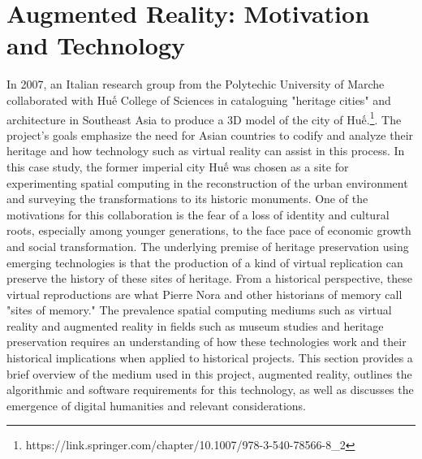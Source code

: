 \chapter[Augmented Reality]{Augmented Reality: Motivation and Technology}\label{text}
\vi
In 2007, an Italian research group from the Polytechic University of Marche collaborated with Huế College of Sciences in cataloguing "heritage cities" and architecture in Southeast Asia to produce a 3D model of the city of Huế.\footnote{https://link.springer.com/chapter/10.1007/978-3-540-78566-8\_2}. The project's goals emphasize the need for Asian countries to codify and analyze their heritage and how technology such as virtual reality can assist in this process. In this case study, the former imperial city Huế was chosen as a site for experimenting spatial computing in the reconstruction of the urban environment and surveying the transformations to its historic monuments. One of the motivations for this collaboration is the fear of a loss of identity and cultural roots, especially among younger generations, to the face pace of economic growth and social transformation. The underlying premise of heritage preservation using emerging technologies is that the production of a kind of virtual replication can preserve the history of these sites of heritage. From a historical perspective, these virtual reproductions are what Pierre Nora and other historians of memory call "sites of memory." The prevalence spatial computing mediums such as virtual reality and augmented reality in fields such as museum studies and heritage preservation requires an understanding of how these technologies work and their historical implications when applied to historical projects. This section provides a brief overview of the medium used in this project, augmented reality, outlines the algorithmic and software requirements for this technology, as well as discusses the emergence of digital humanities and relevant considerations.

